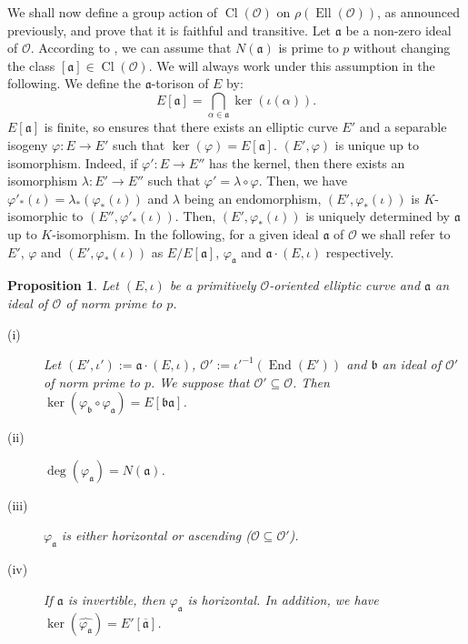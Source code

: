 \documentclass[a4paper,10pt]{report}
\theoremstyle{definition}
\theoremstyle{plain}
\newtheorem{Proposition}[Definition]{Proposition}
\theoremstyle{definition}
\newcommand{\mO}{\mathcal{O}}
\renewcommand{\(}{\left(}
\renewcommand{\)}{\right)}
\newcommand{\mf}[1]{\mathfrak{#1}}
\DeclareMathOperator{\End}{End}
\DeclareMathOperator{\Cl}{Cl}
\DeclareMathOperator{\Ell}{Ell}
\begin{document}
We shall now define a group action of $\Cl(\mO)$ on $\rho(\Ell(\mO))$, as announced previously, and prove that it is faithful and transitive. Let $\mf{a}$ be a non-zero ideal of $\mO$. According to \cite[Corollary 7.17]{Cox}, we can assume that $N(\mf{a})$ is prime to $p$ without changing the class $[\mf{a}]\in\Cl(\mO)$. We will always work under this assumption in the following. We define the $\mf{a}$-torison of $E$ by:
\[E[\mf{a}]=\bigcap_{\alpha\in\mf{a}}\ker(\iota(\alpha)).\]
$E[\mf{a}]$ is finite, so \cite[Proposition III.4.12]{Silverman1} ensures that there exists an elliptic curve $E'$ and a separable isogeny $\varphi:E\longrightarrow E'$ such that $\ker(\varphi)=E[\mf{a}]$. $(E',\varphi)$ is unique up to isomorphism. Indeed, if $\varphi':E\longrightarrow E''$ has the kernel, then there exists an isomorphism $\lambda : E'\longrightarrow E''$ such that $\varphi'=\lambda\circ\varphi$. Then, we have $\varphi'_*(\iota)=\lambda_*(\varphi_*(\iota))$ and $\lambda$ being an endomorphism, $(E',\varphi_*(\iota))$ is $K$-isomorphic to $(E'',\varphi'_*(\iota))$. Then, $(E',\varphi_*(\iota))$ is uniquely determined by $\mf{a}$ up to $K$-isomorphism. In the following, for a given ideal $\mf{a}$ of $\mO$ we shall refer to  $E'$, $\varphi$ and $(E',\varphi_*(\iota))$ as $E/E[\mf{a}]$, $\varphi_{\mf{a}}$ and $\mf{a}\cdot(E,\iota)$ respectively.

\begin{Proposition}\label{Proposition 3}
Let $(E,\iota)$ be a primitively $\mO$-oriented elliptic curve and $\mf{a}$ an ideal of $\mO$ of norm prime to $p$. 
\begin{description}
\item[(i)] Let $(E',\iota'):=\mf{a}\cdot (E,\iota)$,  $\mO':=\iota'^{-1}(\End(E'))$ and $\mf{b}$ an ideal of $\mO'$ of norm prime to $p$.  We suppose that $\mO'\subseteq\mO$. Then $\ker(\varphi_{\mf{b}}\circ\varphi_{\mf{a}})=E[\mf{b}\mf{a}]$.
\item[(ii)] $\deg(\varphi_{\mf{a}})=N(\mf{a})$.
\item[(iii)] $\varphi_{\mf{a}}$ is either horizontal or ascending ($\mO\subseteq\mO'$).
\item[(iv)] If $\mf{a}$ is invertible, then $\varphi_{\mf{a}}$ is horizontal. In addition, we have $\ker(\widehat{\varphi_{\mf{a}}})=E'[\overline{\mf{a}}]$.
\end{description}
\end{Proposition}
\end{document}

